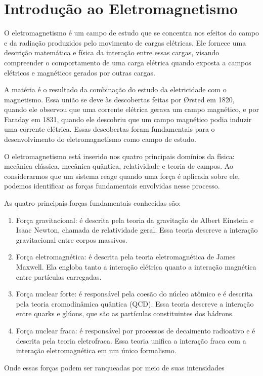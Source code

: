 \section{Introdução ao Eletromagnetismo}
O eletromagnetismo é um campo de estudo que se concentra nos efeitos do campo e da radiação produzidos pelo movimento de cargas elétricas. Ele fornece uma descrição matemática e física da interação entre essas cargas, visando compreender o comportamento de uma carga elétrica quando exposta a campos elétricos e magnéticos gerados por outras cargas.

A matéria é o resultado da combinação do estudo da eletricidade com o magnetismo. Essa união se deve às descobertas feitas por Ørsted em 1820, quando ele observou que uma corrente elétrica gerava um campo magnético, e por Faraday em 1831, quando ele descobriu que um campo magnético podia induzir uma corrente elétrica. Essas descobertas foram fundamentais para o desenvolvimento do eletromagnetismo como campo de estudo.

O eletromagnetismo está inserido nos quatro principais domínios da física: mecânica clássica, mecânica quântica, relatividade e teoria de campos. Ao considerarmos que um sistema reage quando uma força é aplicada sobre ele, podemos identificar as forças fundamentais envolvidas nesse processo.



As quatro principais forças fundamentais conhecidas são:

\begin{enumerate}
    \item  Força gravitacional: é descrita pela teoria da gravitação de Albert Einstein e Isaac Newton, chamada de relatividade geral. Essa teoria descreve a interação gravitacional entre corpos massivos.

    \item Força eletromagnética: é descrita pela teoria eletromagnética de James Maxwell. Ela engloba tanto a interação elétrica quanto a interação magnética entre partículas carregadas.

    \item Força nuclear forte: é responsável pela coesão do núcleo atômico e é descrita pela teoria cromodinâmica quântica (QCD). Essa teoria descreve a interação entre quarks e glúons, que são as partículas constituintes dos hádrons.

    \item Força nuclear fraca: é responsável por processos de decaimento radioativo e é descrita pela teoria eletrofraca. Essa teoria unifica a interação fraca com a interação eletromagnética em um único formalismo.
\end{enumerate}
\newpage
Onde essas forças podem ser ranqueadas por meio de suas intensidades


